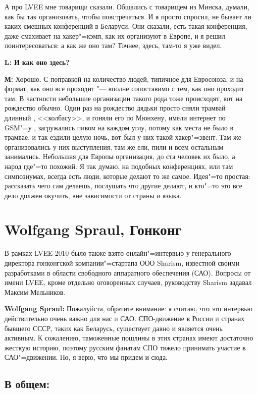 \documentclass[10pt, a5paper]{article}
\begin{document}
А про LVEE мне товарищи сказали. Общались с товарищем из Минска, думали, как бы так организовать, чтобы повстречаться. И я просто спросил, не бывает ли каких смешных конференций в Беларуси. Они сказали, есть такая конференция, даже смахивает на хакер"=кэмп, как их организуют в Европе, и я решил поинтересоваться: а как же оно там? Точнее, здесь, там-то я уже видел. 

{\noindent \bf L: И как оно здесь?}

{\noindent \bf М:} Хорошо. С поправкой на количество людей, типичное для Евросоюза, и на формат, как оно все проходит "--- вполне сопоставимо с тем, как оно проходит там. В частности небольшие организации такого рода тоже происходят, вот на рождество обычно. Один раз на рождество дядьки просто сняли трамвай длинный , <<колбасу>>, и гоняли его по Мюнхену, имели интернет по GSM"=у , загружались пивом на каждом углу, потому как места не было в трамвае, и так ездили целую ночь, вот был у них такой хакер"=эвент. Там же организовались у них выступления, там же ели, пили и всем остальным занимались. Небольшая для Европы организация, до ста человек их было, а народ где"=то похожий. Я так думаю, на подобных конференциях, или там симпозиумах, всегда есть люди, которые делают то же самое. Идея"=то простая: рассказать чего сам делаешь, послушать что другие делают, и кто"=то это все дело должен окучить, вне зависимости от страны и языка.

\section*{\flushleft Wolfgang Spraul, Гонконг}

В рамках LVEE 2010 было также взято онлайн"=интервью у генерального директора гонконгской компании"=стартапа ООО Sharism, известной своими разработками в области свободного аппаратного обеспечения (САО). Вопросы от имени LVEE, кроме отдельно оговоренных случаев, руководству Sharism задавал Максим Мельников.

{\noindent \bf Wolfgang Spraul:} Пожалуйста, обратите внимание: я считаю, что это интервью действительно очень важно для нас и САО. СПО-движение в России и странах бывшего СССР, таких как Беларусь, существует давно и является очень активным. К сожалению, таможенные пошлины в этих странах имеют достаточно жесткую историю, поэтому русским фанатам СПО тяжело принимать участие в САО"=движении. Но, я верю, что мы придем и сюда.

\subsection*{В общем:}
\end{document}
